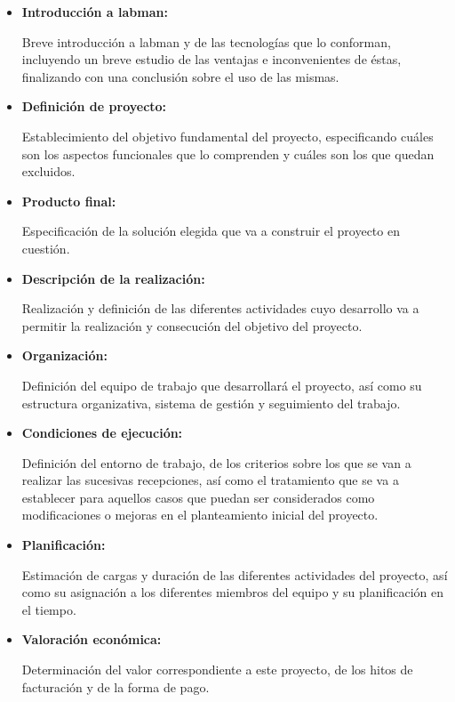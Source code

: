 \begin{itemize}
	\item \textbf{Introducción a \acrshort{labman}:}

	Breve introducción a \acrshort{labman} y de las tecnologías que lo conforman, incluyendo un breve estudio de las ventajas e inconvenientes de éstas, finalizando con una conclusión sobre el uso de las mismas.

	\item \textbf{Definición de proyecto:}
		
	Establecimiento del objetivo fundamental del proyecto, especificando cuáles son los aspectos funcionales que lo comprenden y cuáles son los que quedan excluidos.
	
	\item \textbf{Producto final:}
		
	Especificación de la solución elegida que va a construir el proyecto en cuestión.
	
	\item \textbf{Descripción de la realización:}

	Realización y definición de las diferentes actividades cuyo desarrollo va a permitir la realización y consecución del objetivo del proyecto.

	\item \textbf{Organización:}
	
	Definición del equipo de trabajo que desarrollará el proyecto, así como su estructura organizativa, sistema de gestión y seguimiento del trabajo.

	\item \textbf{Condiciones de ejecución:}

	Definición del entorno de trabajo, de los criterios sobre los que se van a realizar las sucesivas recepciones, así como el tratamiento que se va a establecer para aquellos casos que puedan ser considerados como modificaciones o mejoras en el planteamiento inicial del proyecto.

	\item \textbf{Planificación:}
	
	Estimación de cargas y duración de las diferentes actividades del proyecto, así como su asignación a los diferentes miembros del equipo y su planificación en el tiempo.

	\item \textbf{Valoración económica:}
	
	Determinación del valor correspondiente a este proyecto, de los hitos de facturación y de la forma de pago.


\end{itemize}
